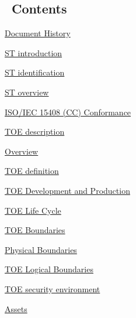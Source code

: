 \documentclass[10pt,a4paper,english]{article}
\begin{document}
\subsection*{~\hfill Contents\hfill ~}
\begin{list}{}{}
\item {} \href{\#document-history}{Document History}

\item {} \href{\#st-introduction}{ST introduction}
\begin{list}{}{}
\item {} \href{\#st-identification}{ST identification}

\item {} \href{\#st-overview}{ST overview}

\item {} \href{\#iso-iec-15408-cc-conformance}{ISO/IEC 15408 (CC) Conformance}

\end{list}

\item {} \href{\#toe-description}{TOE description}
\begin{list}{}{}
\item {} \href{\#overview}{Overview}

\item {} \href{\#toe-definition}{TOE definition}

\item {} \href{\#toe-development-and-production}{TOE Development and Production}

\item {} \href{\#toe-life-cycle}{TOE Life Cycle}

\item {} \href{\#toe-boundaries}{TOE Boundaries}
\begin{list}{}{}
\item {} \href{\#physical-boundaries}{Physical Boundaries}

\item {} \href{\#toe-logical-boundaries}{TOE Logical Boundaries}

\end{list}

\end{list}

\item {} \href{\#toe-security-environment}{TOE security environment}
\begin{list}{}{}
\item {} \href{\#assets}{Assets}


\end{list}
\end{list}
\end{document}
